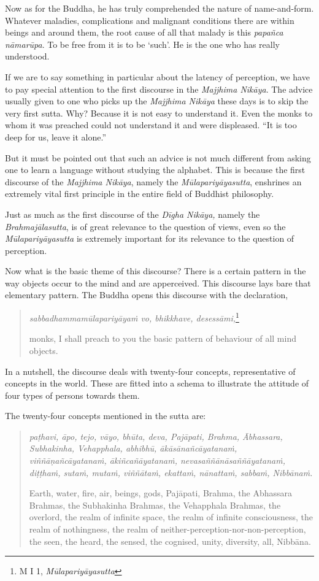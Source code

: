Now as for the Buddha, he has truly comprehended the nature of name-and-form. Whatever maladies, complications and malignant conditions there are within beings and around them, the root cause of all that malady is this \emph{papañca nāmarūpa}. To be free from it is to be `such'. He is the one who has really understood.

If we are to say something in particular about the latency of perception, we have to pay special attention to the first discourse in the \emph{Majjhima Nikāya}. The advice usually given to one who picks up the \emph{Majjhima Nikāya} these days is to skip the very first sutta. Why? Because it is not easy to understand it. Even the monks to whom it was preached could not understand it and were displeased. ``It is too deep for us, leave it alone.''

But it must be pointed out that such an advice is not much different from asking one to learn a language without studying the alphabet. This is because the first discourse of the \emph{Majjhima Nikāya}, namely the \emph{Mūlapariyāyasutta}, enshrines an extremely vital first principle in the entire field of Buddhist philosophy.

Just as much as the first discourse of the \emph{Dīgha Nikāya,} namely the \emph{Brahmajālasutta}, is of great relevance to the question of views, even so the \emph{Mūlapariyāyasutta} is extremely important for its relevance to the question of perception.

Now what is the basic theme of this discourse? There is a certain pattern in the way objects occur to the mind and are apperceived. This discourse lays bare that elementary pattern. The Buddha opens this discourse with the declaration,

\begin{quote}
\emph{sabbadhammamūlapariyāyaṁ vo, bhikkhave, desessāmi,}\footnote{M I 1, \emph{Mūlapariyāyasutta}}

monks, I shall preach to you the basic pattern of behaviour of all mind objects.
\end{quote}

In a nutshell, the discourse deals with twenty-four concepts, representative of concepts in the world. These are fitted into a schema to illustrate the attitude of four types of persons towards them.

The twenty-four concepts mentioned in the sutta are:

\begin{quote}
\emph{paṭhavi, āpo, tejo, vāyo, bhūta, deva, Pajāpati, Brahma, Ābhassara, Subhakinha, Vehapphala, abhibhū, ākāsānañcāyatanaṁ, viññāṇañcāyatanaṁ, ākiñcañāyatanaṁ, nevasaññānāsaññāyatanaṁ, diṭṭhaṁ, sutaṁ, mutaṁ, viññātaṁ, ekattaṁ, nānattaṁ, sabbaṁ, Nibbānaṁ.}

Earth, water, fire, air, beings, gods, Pajāpati, Brahma, the Abhassara Brahmas, the Subhakinha Brahmas, the Vehapphala Brahmas, the overlord, the realm of infinite space, the realm of infinite consciousness, the realm of nothingness, the realm of neither-perception-nor-non-perception, the seen, the heard, the sensed, the cognised, unity, diversity, all, Nibbāna.
\end{quote}


